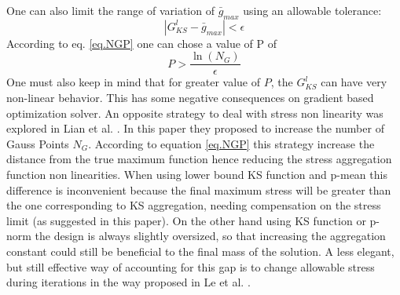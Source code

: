 One can also limit the range of variation of $\bar{g}_{max}$ using an allowable tolerance: 
\begin{equation}
\left|G^{l}_{KS}-\bar{g}_{max}\right|<\epsilon 
\end{equation}
According to eq. \eqref{eq.NGP} one can chose a value of P of
\begin{equation}
  P>\frac{\ln\left(N_G\right)}{\epsilon} 
\end{equation}
One must also keep in mind that for greater value of $P$, the $G_{KS}^l$ can have very non-linear behavior. This has some negative consequences on gradient based optimization solver. An opposite strategy to deal with stress non linearity was explored in Lian et al. \cite{lian2017combined}. In this paper they proposed to increase the number of Gauss Points $N_G$. According to equation \eqref{eq.NGP} this strategy increase the distance from the true maximum function hence reducing the stress aggregation function non linearities. When using lower bound KS function and p-mean this difference is inconvenient because the final maximum stress will be greater than the one  corresponding to KS aggregation, needing compensation on the stress limit (as suggested in this paper). On the other hand using KS function or p-norm the design is always slightly oversized, so that increasing the aggregation constant could still be beneficial to the final mass of the solution. A less elegant, but still effective way of accounting for this gap is to change allowable stress during iterations in the way proposed in Le et al. \cite{le2010stress}.   
